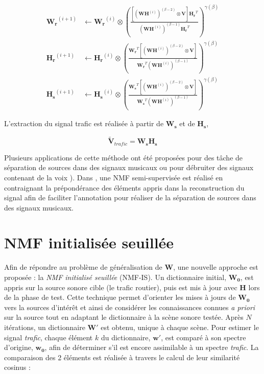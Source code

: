 \begin{subequations}\label{eq:WH-SSupdate}
\begin{align}
\mathbf{W_r}^{(i+1)} &\leftarrow \mathbf{W_r}^{(i)}\otimes\left(\frac{\left[\left(\mathbf{WH}^{(i)} \right)^{(\beta-2)}\otimes\mathbf{V} \right]\mathbf{H_r}^T}{\left(\mathbf{WH}^{(i)} \right)^{(\beta-1)}\mathbf{H_r}^T}\right)^{\gamma(\beta)}\label{eq:W_r_SS}\\
\mathbf{H_r}^{(i+1)} &\leftarrow \mathbf{H_r}^{(i)}\otimes\left(\frac{\mathbf{W_r}^T \left[\left(\mathbf{WH}^{(i)} \right)^{(\beta-2)}\otimes\mathbf{V} \right]}{\mathbf{W_r}^T \left(\mathbf{WH}^{(i)} \right)^{(\beta-1)}}\right)^{\gamma(\beta)}\label{eq:H_r_SS}\\
\mathbf{H_s}^{(i+1)} &\leftarrow \mathbf{H_s}^{(i)}\otimes\left(\frac{\mathbf{W_s}^T \left[\left(\mathbf{WH}^{(i)} \right)^{(\beta-2)}\otimes\mathbf{V} \right]}{\mathbf{W_s}^T \left(\mathbf{WH}^{(i)} \right)^{(\beta-1)}}\right)^{\gamma(\beta)}\label{eq:H_s_SS}
\end{align}
\end{subequations}

L'extraction du signal trafic est réalisée à partir de $\mathbf{W_s}$ et de $\mathbf{H_s}$,

\begin{equation}
\mathbf{\tilde{V}}_{trafic} = \mathbf{W_s H_s}
\end{equation}

Plusieurs applications de cette méthode ont été proposées pour des tâche de séparation de sources dans des signaux musicaux\cite{smaragdis2007supervised} ou pour débruiter des signaux contenant de la voix \cite{mysore2011non, duan2012online}). Dans \cite{lefevre2012semi}, une NMF semi-supervisée est réalisé en contraignant la prépondérance des éléments appris dans la reconstruction du signal afin de faciliter l'annotation pour réaliser de la séparation de sources dans des signaux musicaux.


\section{NMF initialisée seuillée}\label{sec:NMF_TI}

Afin de répondre au problème de généralisation de $\mathbf{W}$, une nouvelle approche est proposée : la \textit{NMF initialisé seuillée} (NMF-IS). Un dictionnaire initial, $\mathbf{W_0}$, est appris sur la source sonore cible (le trafic routier), puis est mis à jour avec $\mathbf{H}$ lors de la phase de test.
Cette technique permet d'orienter les mises à jours de $\mathbf{W_0}$ vers la sources d'intérêt et ainsi de considérer les connaissances connues \textit{a priori} sur la source tout en adaptant le dictionnaire à la scène sonore testée. Après $N$ itérations, un dictionnaire $\mathbf{W'}$ est obtenu, unique à chaque scène. Pour estimer le signal \textit{trafic}, chaque élément $k$ du dictionnaire, $\mathbf{w'}$, est comparé à son spectre d'origine, $\mathbf{w_0}$, afin de déterminer s'il est encore assimilable à un spectre \textit{trafic}. La comparaison des 2 éléments est réalisée à travers le calcul de leur similarité cosinus :

